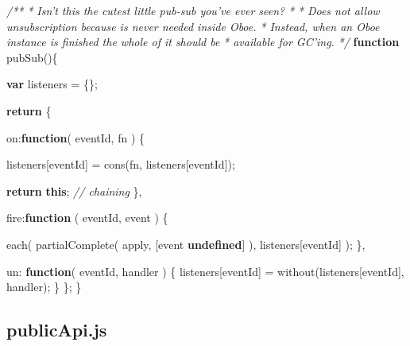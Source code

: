 \documentclass[]{article}
\newenvironment{Shaded}{}{}
\newcommand{\KeywordTok}[1]{\textcolor[rgb]{0.00,0.44,0.13}{\textbf{{#1}}}}
\newcommand{\DataTypeTok}[1]{\textcolor[rgb]{0.56,0.13,0.00}{{#1}}}
\newcommand{\CommentTok}[1]{\textcolor[rgb]{0.38,0.63,0.69}{\textit{{#1}}}}
\newcommand{\FunctionTok}[1]{\textcolor[rgb]{0.02,0.16,0.49}{{#1}}}
\newcommand{\NormalTok}[1]{{#1}}
\begin{document}
\begin{Shaded}
\begin{Highlighting}[]
\CommentTok{/**}
\CommentTok{ * Isn't this the cutest little pub-sub you've ever seen?}
\CommentTok{ * }
\CommentTok{ * Does not allow unsubscription because is never needed inside Oboe.}
\CommentTok{ * Instead, when an Oboe instance is finished the whole of it should be}
\CommentTok{ * available for GC'ing.}
\CommentTok{ */}
\KeywordTok{function} \FunctionTok{pubSub}\NormalTok{()\{}

   \KeywordTok{var} \NormalTok{listeners = \{\};}
                             
   \KeywordTok{return} \NormalTok{\{}

      \DataTypeTok{on}\NormalTok{:}\KeywordTok{function}\NormalTok{( eventId, fn ) \{}
         
         \NormalTok{listeners[eventId] = }\FunctionTok{cons}\NormalTok{(fn, listeners[eventId]);}

         \KeywordTok{return} \KeywordTok{this}\NormalTok{; }\CommentTok{// chaining}
      \NormalTok{\}, }
    
      \DataTypeTok{fire}\NormalTok{:}\KeywordTok{function} \NormalTok{( eventId, event ) \{}
               
         \FunctionTok{each}\NormalTok{(}
            \FunctionTok{partialComplete}\NormalTok{( apply, [event \textbar{}\textbar{} }\KeywordTok{undefined}\NormalTok{] ), }
            \NormalTok{listeners[eventId]}
         \NormalTok{);}
      \NormalTok{\},}
      
      \DataTypeTok{un}\NormalTok{: }\KeywordTok{function}\NormalTok{( eventId, handler ) \{}
         \NormalTok{listeners[eventId] = }\FunctionTok{without}\NormalTok{(listeners[eventId], handler);}
      \NormalTok{\}           }
   \NormalTok{\};}
\NormalTok{\}}
\end{Highlighting}
\end{Shaded}

\pagebreak

\subsection{publicApi.js}
\end{document}
